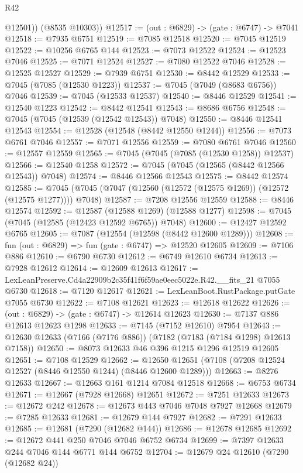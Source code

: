 \begin{lexlean}{R42}
\begin{coremodule}
{          @12501))
      (@8535 @10303))
@12517 := (out : @6829) -> (gate : @6747) -> @7041
@12518 := @7935 @6751
@12519 := @7085 @12518
@12520 := @7045 @12519
@12522 := @10256 @6765 @144
@12523 := @7073 @12522
@12524 := @12523 @7046
@12525 := @7071 @12524
@12527 := @7080 @12522 @7046
@12528 := @12525 @12527
@12529 := @7939 @6751
@12530 := @8442 @12529
@12533 := @7045 (@7085 (@12530 @1223))
@12537 := @7045 (@7049 (@8683 @6756)) @7046
@12539 := @7045 (@12533 @12537)
@12540 := @8446 @12529
@12541 := @12540 @1223
@12542 := @8442 @12541
@12543 := @8686 @6756
@12548 := @7045 (@7045 (@12539 (@12542 @12543)) @7048)
@12550 := @8446 @12541 @12543
@12554 := @12528 (@12548 (@8442 @12550 @1244))
@12556 := @7073 @6761 @7046
@12557 := @7071 @12556
@12559 := @7080 @6761 @7046
@12560 := @12557 @12559
@12565 := @7045 (@7045 (@7085 (@12530 @1258)) @12537)
@12566 := @12540 @1258
@12572 := @7045 (@7045 (@12565 (@8442 @12566 @12543)) @7048)
@12574 := @8446 @12566 @12543
@12575 := @8442 @12574
@12585 := @7045 (@7045 (@7047 (@12560 (@12572 (@12575 @1269)) (@12572 (@12575 @1277)))) @7048)
@12587 := @7208 @12556 @12559
@12588 := @8446 @12574
@12592 := @12587 (@12588 @1269) (@12588 @1277)
@12598 := @7045 (@7045 (@12585 (@12423 @12592 @6765)) @7048)
@12600 := @12427 @12592 @6765
@12605 := @7087 (@12554 (@12598 (@8442 @12600 @1289)))
@12608 := fun (out : @6829) => fun (gate : @6747) => @12520 @12605
@12609 := @7106 @886
@12610 := @6790 @6730
@12612 := @6749 @12610 @6734
@12613 := @7928 @12612
@12614 := @12609 @12613
@12617 := LexLeanPreserve.Cd4a22909b2c35f41f6f59ae0eec5022e.R42.__fits_21 @7055 @6730
@12618 := @7120 @12617
@12621 := LexLeanBoot.RustPackage.putGate @7055 @6730
@12622 := @7108 @12621
@12623 := @12618 @12622
@12626 := (out : @6829) -> (gate : @6747) -> @12614 @12623
@12630 := @7137 @886 @12613 @12623 @1298
@12633 := @7145 (@7152 @12610) @7954
@12643 := @12630 @12633 (@7166 (@7176 @886)) (@7182 (@7183 (@7184 @1298) @12613 @7158))
@12650 := @8073 @12633 @46 @396 @1215 @1296 @12519 @12605
@12651 := @7108 @12529
@12662 := @12650 @12651 (@7108 (@7208 @12524 @12527 (@8446 @12550 @1244) (@8446 @12600 @1289)))
@12663 := @8276 @12633
@12667 := @12663 @161 @1214 @7084 @12518
@12668 := @6753 @6734
@12671 := @12667 (@7928 @12668) @12651
@12672 := @7251 @12633
@12673 := @12672 @242
@12678 := @12673 @443 @7046 @7048 @7927 @12668
@12679 := @7285 @12633
@12681 := @12679 @144 @7927
@12682 := @7291 @12633
@12685 := @12681 (@7290 (@12682 @144))
@12686 := @12678 @12685
@12692 := @12672 @441 @250 @7046 @7046 @6752 @6734
@12699 := @7397 @12633 @244 @7046 @144 @6771 @144 @6752
@12704 := @12679 @24 @12610 (@7290 (@12682 @24))
}
\end{coremodule}
\end{lexlean}
